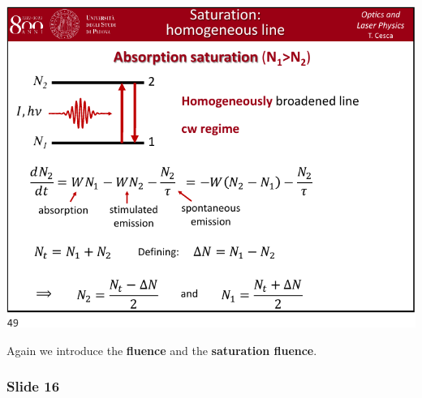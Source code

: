 \documentclass[../main/main.tex]{subfiles}
\begin{document}
\begin{minipage}[]{0.5\linewidth}
\centering
\includegraphics[page=15,width=1\textwidth]{../lessons/pdf_file/10_lecture.pdf}
\end{minipage}
\hspace{0.3cm}\vspace{0.3cm}
\begin{minipage}[c]{0.47\linewidth}

Again we introduce the \textbf{fluence} and the \textbf{saturation fluence}.

\end{minipage}

\subsubsection*{Slide 16}
\end{document}

